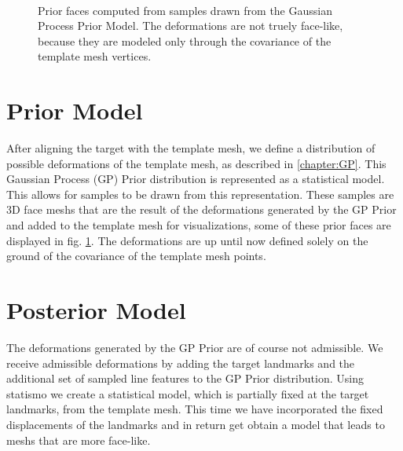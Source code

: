 \begin{figure}[h]
\centering
{}\\
\label{fig:priorprofile}
\caption{Prior faces computed from samples drawn from the Gaussian Process Prior Model. The deformations are not truely face-like, because they are modeled only through the covariance of the template mesh vertices.}
\end{figure}

\section{Prior Model}
After aligning the target with the template mesh, we define a distribution of possible deformations of the template mesh, as described in \ref{chapter:GP}. This Gaussian Process (GP) Prior distribution is represented as a statistical model. This allows for samples to be drawn from this representation. These samples are 3D face meshs that are the result of the deformations generated by the GP Prior and added to the template mesh for visualizations, some of these prior faces are displayed in fig. \ref{fig:priorprofile}. The deformations are up until now defined solely on the ground of the covariance of the template mesh points.

\section{Posterior Model}
The deformations generated by the GP Prior are of course not admissible. We receive admissible deformations by adding the target landmarks and the additional set of sampled line features to the GP Prior distribution. Using statismo we create a statistical model, which is partially fixed at the target landmarks, from the template mesh. This time we have incorporated the fixed displacements of the landmarks and in return get obtain a model that leads to meshs that are more face-like.

